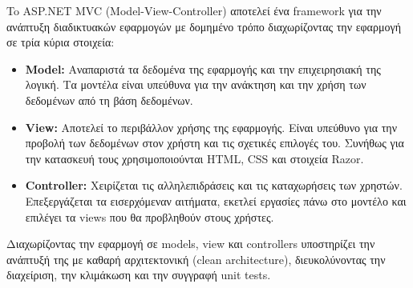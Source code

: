 To ASP.NET MVC (Model-View-Controller) αποτελεί ένα framework για την ανάπτυξη διαδικτυακών εφαρμογών
με δομημένο τρόπο διαχωρίζοντας την εφαρμογή σε τρία κύρια στοιχεία:
\begin{itemize}
    \item \textbf{Model:} Αναπαριστά τα δεδομένα της εφαρμογής και την επιχειρησιακή της λογική. Τα μοντέλα
            είναι υπεύθυνα για την ανάκτηση και την χρήση των δεδομένων από τη βάση δεδομένων.
     \item  \textbf{View:} Αποτελεί το περιβάλλον χρήσης της εφαρμογής. Είναι υπεύθυνο για την προβολή
            των δεδομένων στον χρήστη και τις σχετικές επιλογές του. Συνήθως για την κατασκευή τους
            χρησιμοποιούνται HTML, CSS και στοιχεία Razor.
    \item  \textbf{Controller:} Χειρίζεται τις αλληλεπιδράσεις και τις καταχωρήσεις των χρηστών. 
            Επεξεργάζεται τα εισερχόμεναν αιτήματα, εκετλεί εργασίες πάνω στο μοντέλο και επιλέγει
            τα views που θα προβληθούν στους χρήστες.
\end{itemize}

Διαχωρίζοντας την εφαρμογή σε models, view και controllers υποστηρίζει την ανάπτυξή της με καθαρή 
αρχιτεκτονική (clean architecture), διευκολύνοντας την διαχείριση, την κλιμάκωση και την συγγραφή
unit tests.